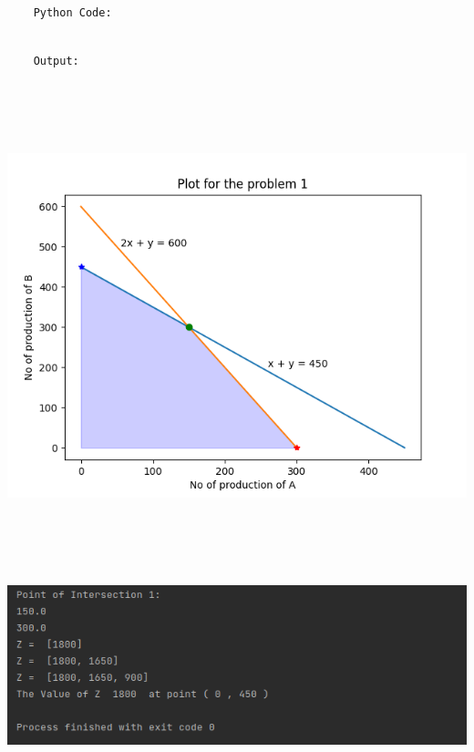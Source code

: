 \documentclass[12pt, letterpaper, twoside]{book}
\begin{document}
\begin{lstlisting}

	Python Code:

\end{lstlisting}

\pagebreak
\begin{lstlisting}

	Output:

\end{lstlisting}
\begin{center}
\includegraphics[height=400pt]{Plot1}
\end{center}
\begin{flushleft}
\includegraphics[width=\paperwidth]{Output1}
\end{flushleft}
\end{document}
